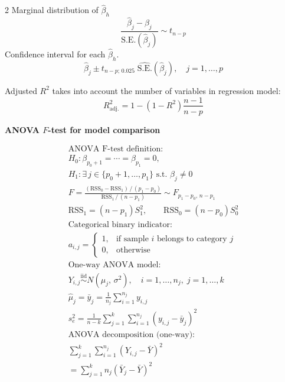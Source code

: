 \documentclass[10pt]{extarticle}
\theoremstyle{definition}
\theoremstyle{remark}
\begin{document}
\begin{multicols}{2}
    Marginal distribution of $\hat{\beta}_h$
    \[ \frac{\hat{\beta}_j - \beta_j}{\text{S.E.}(\hat{\beta}_j)} \sim t_{n-p} \] 
    Confidence interval for each $\hat{\beta}_h$.
    \[ \hat{\beta}_j \pm t_{n-p;\,0.025}\;\widehat{\text{S.E.}}(\hat{\beta}_j), \quad j = 1, \ldots, p \]

    Adjusted $R^2$ takes into account the number of variables in regression model:
    \[ R^2_{\text{adj.}} = 1 - (1 - R^2)\frac{n-1}{n-p} \]

    \noindent
    \textbf{ANOVA $F$-test for model comparison}

    \begin{gather*}
        \text{ANOVA F-test definition:} \\
        H_0: \beta_{p_0+1} = \cdots = \beta_{p_1} = 0, \quad \\
        H_1: \exists\, j \in \{p_0+1,\ldots,p_1\} \text{ s.t. } \beta_j \neq 0 \\
        F = \frac{(\text{RSS}_0 - \text{RSS}_1)\,/\,(p_1 - p_0)}{\text{RSS}_1\,/\,(n - p_1)} \sim F_{p_1-p_0,\,n-p_1} \\
        \text{RSS}_1 = (n - p_1)S_1^2, \qquad \text{RSS}_0 = (n - p_0)S_0^2 \\
        \text{Categorical binary indicator:} \\
        a_{i,j} = \begin{cases} 1, & \text{if sample } i \text{ belongs to category } j \\ 0, & \text{otherwise} \end{cases} \\
        \text{One-way ANOVA model:} \\
        Y_{i,j} \overset{\text{iid}}{\sim} N(\mu_j,\, \sigma^2), \quad i = 1,\ldots,n_j,\; j = 1,\ldots,k \\
        \hat{\mu}_j = \bar{y}_j = \frac{1}{n_j}\sum_{i=1}^{n_j} y_{i,j} \\
        s_e^2 = \frac{1}{n-k}\sum_{j=1}^k \sum_{i=1}^{n_j}(y_{i,j} - \bar{y}_j)^2 \\
        \text{ANOVA decomposition (one-way):} \\
        \sum_{j=1}^k \sum_{i=1}^{n_j}(Y_{i,j} - \bar{Y})^2 \\
        = \sum_{j=1}^k n_j(\bar{Y}_j - \bar{Y})^2 \\

\end{gather*}
\end{multicols}
\end{document}

